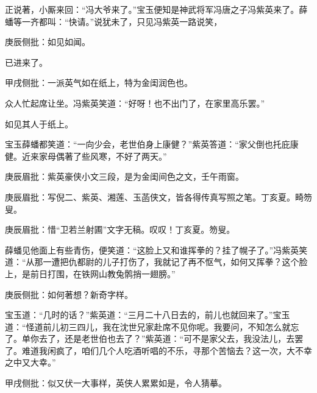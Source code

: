 \begin{parag}


    正说著，小厮来回：“冯大爷来了。”宝玉便知是神武将军冯唐之子冯紫英来了。薛蟠等一齐都叫：“快请。”说犹未了，只见冯紫英一路说笑，\begin{note}庚辰侧批：如见如闻。\end{note}已进来了。\begin{note}甲戌侧批：一派英气如在纸上，特为金闺润色也。\end{note}众人忙起席让坐。冯紫英笑道：“好呀！也不出门了，在家里高乐罢。”\begin{note}如见其人于纸上。\end{note}宝玉薛蟠都笑道：“一向少会，老世伯身上康健？”紫英答道：“家父倒也托庇康健。近来家母偶著了些风寒，不好了两天。”\begin{note}庚辰眉批：紫英豪侠小文三段，是为金闺间色之文，壬午雨窗。\end{note}\begin{note}庚辰眉批：写倪二、紫英、湘莲、玉菡侠文，皆各得传真写照之笔。丁亥夏。畸笏叟。\end{note}\begin{note}庚辰眉批：惜“卫若兰射圃”文字无稿。叹叹！丁亥夏。笏叟。\end{note}薛蟠见他面上有些青伤，便笑道：“这脸上又和谁挥拳的？挂了幌子了。”冯紫英笑道：“从那一遭把仇都尉的儿子打伤了，我就记了再不怄气，如何又挥拳？这个脸上，是前日打围，在铁网山教兔鹘捎一翅膀。”\begin{note}庚辰侧批：如何著想？新奇字样。\end{note}宝玉道：“几时的话？”紫英道：“三月二十八日去的，前儿也就回来了。”宝玉道：“怪道前儿初三四儿，我在沈世兄家赴席不见你呢。我要问，不知怎么就忘了。单你去了，还是老世伯也去了？”紫英道：“可不是家父去，我没法儿，去罢了。难道我闲疯了，咱们几个人吃酒听唱的不乐，寻那个苦恼去？这一次，大不幸之中又大幸。”\begin{note}甲戌侧批：似又伏一大事样，英侠人累累如是，令人猜摹。\end{note}
\end{parag}


